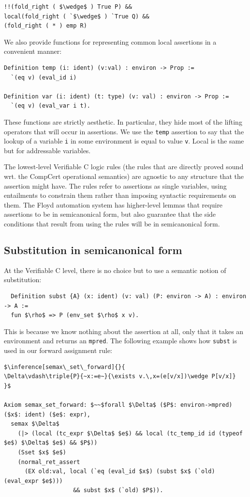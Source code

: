 \documentclass{puthesis}
\begin{document}
\begin{lstlisting}
!!(fold_right ( $\wedge$ ) True P) &&
local(fold_right ( `$\wedge$ ) `True Q) &&
(fold_right ( * ) emp R)
\end{lstlisting}

We also provide functions for representing common local assertions in
a convenient manner:

\begin{lstlisting}
Definition temp (i: ident) (v:val) : environ -> Prop :=
  `(eq v) (eval_id i)

Definition var (i: ident) (t: type) (v: val) : environ -> Prop :=
  `(eq v) (eval_var i t).
\end{lstlisting}

These functions are strictly aesthetic. In particular, they hide most
of the lifting operators that will occur in assertions. We use the
\lstinline|temp| assertion to say that the lookup of a variable
\lstinline|i| in some environment is equal to value
\lstinline|v|. Local is the same but for addressable variables.

The lowest-level Verifiable C logic rules (the rules that are directly
proved sound wrt. the CompCert operational semantics) are agnostic to any
structure that the assertion might have. The rules refer to
assertions as single variables, using entailments to constrain them
rather than imposing syntactic requirements on them. The Floyd
automation system has higher-level lemmas that require assertions
to be in semicanonical form, but also guarantee that the side
conditions that result from using the rules will be in semicanonical
form.

\subsection{Substitution in semicanonical form}

At the Verifiable C level, there is no choice but to use a semantic
notion of substitution:
\pagebreak
\begin{lstlisting}
  Definition subst {A} (x: ident) (v: val) (P: environ -> A) : environ -> A :=
  fun $\rho$ => P (env_set $\rho$ x v).
\end{lstlisting}

This is because we know nothing about the assertion at all, only that
it takes an environment and returns an \lstinline|mpred|. The following example
shows how \lstinline|subst| is used in our forward assignment rule:

\begin{lstlisting}
$\inference[semax\_set\_forward]{}{
\Delta\vdash\triple{P}{~x:=e~}{\exists v.\,x=(e[v/x])\wedge P[v/x]}
}$

Axiom semax_set_forward: $~~$forall $\Delta$ ($P$: environ->mpred) ($x$: ident) ($e$: expr),
  semax $\Delta$
    (|> (local (tc_expr $\Delta$ $e$) && local (tc_temp_id id (typeof $e$) $\Delta$ $e$) && $P$))
    (Sset $x$ $e$) 
    (normal_ret_assert 
      (EX old:val, local (`eq (eval_id $x$) (subst $x$ (`old) (eval_expr $e$)))
                    && subst $x$ (`old) $P$)).
\end{lstlisting}
\end{document}
